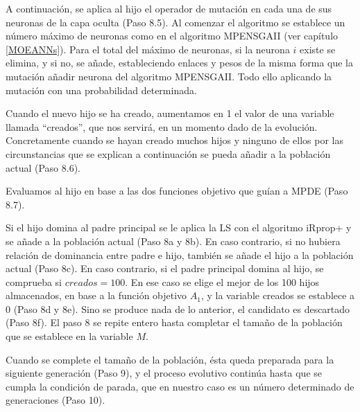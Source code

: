 A continuación, se aplica al hijo el operador de mutación en cada una de sus
neuronas de la capa oculta (Paso 8.5). Al comenzar el algoritmo se establece un número
máximo de neuronas como en el algoritmo MPENSGAII (ver capítulo \ref{MOEANNs}). Para el
total del máximo de neuronas, si la neurona $i$ existe se elimina, y si no, se añade,
estableciendo enlaces y pesos de la misma forma que la mutación añadir neurona del
algoritmo MPENSGAII. Todo ello aplicando la mutación con una probabilidad determinada.

Cuando el nuevo hijo se ha creado, aumentamos en 1 el valor de una
variable llamada ``creados'', que nos servirá, en un momento dado de la evolución. Concretamente
cuando se hayan creado muchos hijos y ninguno de ellos por las circunstancias que se explican a
continuación se pueda añadir a la población actual (Paso 8.6).

Evaluamos al hijo en base a las dos funciones objetivo que guían a MPDE (Paso 8.7).

Si el hijo domina al padre principal se le aplica la LS con el algoritmo iRprop+ y se añade a
la población actual (Paso 8a y 8b). En caso contrario, si no hubiera relación de dominancia entre
padre e hijo, también se añade el hijo a la población actual (Paso 8c). En caso contrario, si el
padre principal domina al hijo, se comprueba si $creados=100$. En ese caso se elige el mejor de los
100 hijos almacenados, en base a la función objetivo $A_{1}$, y la variable creados se establece a
$0$ (Paso 8d y 8e). Sino se produce nada de lo anterior, el candidato es descartado (Paso
8f). El paso 8 se repite entero hasta completar el tamaño de la población que se establece en la
variable $M$.

Cuando se complete el tamaño de la población, ésta queda preparada para la siguiente
generación (Paso 9), y el proceso evolutivo continúa hasta que se cumpla la condición de
parada, que en nuestro caso es un número determinado de generaciones (Paso 10).


